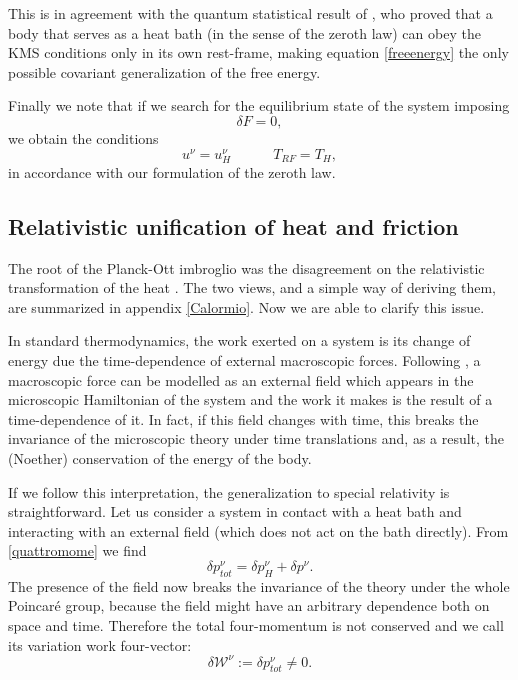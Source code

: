 \documentclass[twocolumn,usenatbib]{mnras2}
\newcommand{\spc}{\quad \quad \quad}
\begin{document}
This is in agreement with the quantum statistical result of \cite{Sewell2008}, who proved that a body that serves as a heat bath (in the sense of the zeroth law) can obey the KMS conditions only in its own rest-frame, making equation \eqref{freeenergy} the only possible covariant generalization of the free energy.

Finally we note that if we search for the equilibrium state of the system imposing 
\begin{equation}
\delta F =0,
\end{equation}
we obtain the conditions
\begin{equation}
u^\nu = u_H^\nu  \spc T_{RF} =T_H,
\end{equation}
in accordance with our formulation of the zeroth law.


\subsection{Relativistic unification of heat and friction} 

The root of the Planck-Ott imbroglio was the disagreement on the relativistic transformation of the heat \citep{Pinto2017}. The two views, and a simple way of deriving them, are summarized in appendix \ref{Calormio}. Now we are able to clarify this issue.

In standard thermodynamics, the work exerted on a system is its change of energy due the time-dependence of external macroscopic forces. Following \cite{landau5}, a macroscopic force can be modelled as an external field which appears in the microscopic Hamiltonian of the system and the work it makes is the result of a time-dependence of it. In fact, if this field changes with time, this breaks the invariance of the microscopic theory under time translations and, as a result, the (Noether) conservation of the energy of the body.

If we follow this interpretation, the generalization to special relativity is straightforward. Let us consider a system in contact with a heat bath and interacting with an external field (which does not act on the bath directly). From \eqref{quattromome} we find
\begin{equation}\label{quid}
\delta p_{tot}^\nu =\delta p_H^\nu +\delta p^\nu.
\end{equation}
The presence of the field now breaks the invariance of the theory under the whole Poincar\'e group, because the field might have an arbitrary dependence both on space and time. Therefore the total four-momentum is not conserved and we call its variation work four-vector:
\begin{equation}
\delta \mathcal{W}^\nu :=\delta p_{tot}^\nu \neq 0 .
\end{equation}
\end{document}
